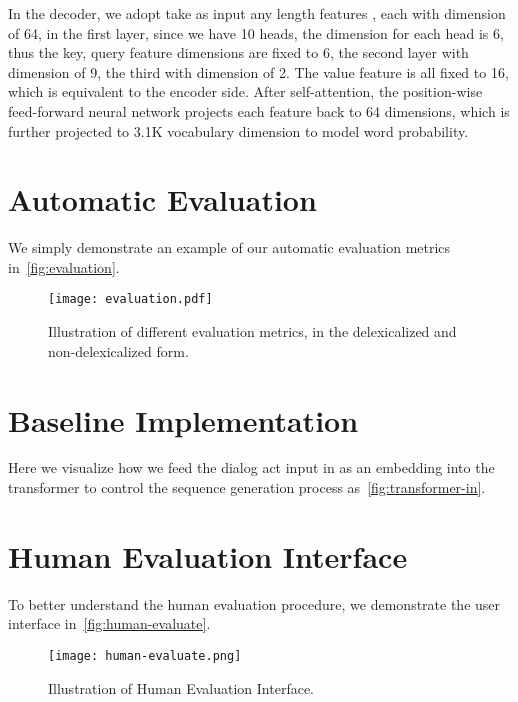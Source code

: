 \documentclass[11pt,a4paper]{article}
\begin{document}
In the decoder, we adopt take as input any length features , each with dimension of 64, in the first layer, since we have 10 heads, the dimension for each head is 6, thus the key, query feature dimensions are fixed to 6, the second layer with dimension of 9, the third with dimension of 2. The value feature is all fixed to 16, which is equivalent to the encoder side. After self-attention, the position-wise feed-forward neural network projects each feature back to 64 dimensions, which is further projected to 3.1K vocabulary dimension to model word probability.  

\section{Automatic Evaluation}
We simply demonstrate an example of our automatic evaluation metrics in~\autoref{fig:evaluation}.
\begin{figure*}[thb]
    \begin{center}
    \texttt{[image: evaluation.pdf]}
    \end{center}
    \caption{Illustration of different evaluation metrics, in the delexicalized and non-delexicalized form.}
    \label{fig:evaluation}
\end{figure*}
\label{sec:appendix}

\section{Baseline Implementation}
Here we visualize how we feed the dialog act input in as an embedding into the transformer to control the sequence generation process as~\autoref{fig:transformer-in}.

\section{Human Evaluation Interface}
To better understand the human evaluation procedure, we demonstrate the user interface in~\autoref{fig:human-evaluate}.
\begin{figure*}[thb]
    \begin{center}
    \texttt{[image: human-evaluate.png]}
    \end{center}
    \caption{Illustration of Human Evaluation Interface. }
    \label{fig:human-evaluate}
\end{figure*}
\end{document}
